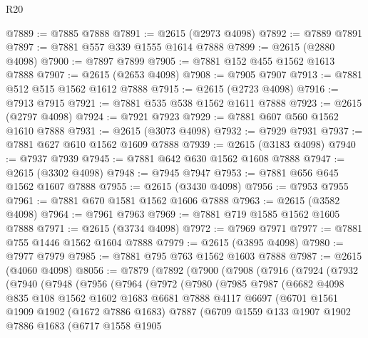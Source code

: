 \begin{lexlean}{R20}
\begin{coremodule}
@7889 := @7885 @7888
@7891 := @2615 (@2973 @4098)
@7892 := @7889 @7891
@7897 := @7881 @557 @339 @1555 @1614 @7888
@7899 := @2615 (@2880 @4098)
@7900 := @7897 @7899
@7905 := @7881 @152 @455 @1562 @1613 @7888
@7907 := @2615 (@2653 @4098)
@7908 := @7905 @7907
@7913 := @7881 @512 @515 @1562 @1612 @7888
@7915 := @2615 (@2723 @4098)
@7916 := @7913 @7915
@7921 := @7881 @535 @538 @1562 @1611 @7888
@7923 := @2615 (@2797 @4098)
@7924 := @7921 @7923
@7929 := @7881 @607 @560 @1562 @1610 @7888
@7931 := @2615 (@3073 @4098)
@7932 := @7929 @7931
@7937 := @7881 @627 @610 @1562 @1609 @7888
@7939 := @2615 (@3183 @4098)
@7940 := @7937 @7939
@7945 := @7881 @642 @630 @1562 @1608 @7888
@7947 := @2615 (@3302 @4098)
@7948 := @7945 @7947
@7953 := @7881 @656 @645 @1562 @1607 @7888
@7955 := @2615 (@3430 @4098)
@7956 := @7953 @7955
@7961 := @7881 @670 @1581 @1562 @1606 @7888
@7963 := @2615 (@3582 @4098)
@7964 := @7961 @7963
@7969 := @7881 @719 @1585 @1562 @1605 @7888
@7971 := @2615 (@3734 @4098)
@7972 := @7969 @7971
@7977 := @7881 @755 @1446 @1562 @1604 @7888
@7979 := @2615 (@3895 @4098)
@7980 := @7977 @7979
@7985 := @7881 @795 @763 @1562 @1603 @7888
@7987 := @2615 (@4060 @4098)
@8056 := @7879
    (@7892
      (@7900
        (@7908
          (@7916
            (@7924
              (@7932
                (@7940
                  (@7948
                    (@7956
                      (@7964
                        (@7972
                          (@7980
                            (@7985
                              @7987
                              (@6682
                                @4098
                                @835
                                @108
                                @1562
                                @1602
                                @1683
                                @6681
                                @7888
                                @4117
                                @6697
                                (@6701
                                  @1561
                                  @1909
                                  @1902
                                  (@1672 @7886 @1683)
                                  @7887
                                  (@6709
                                    @1559
                                    @133
                                    @1907
                                    @1902
                                    @7886
                                    @1683
                                    (@6717
                                      @1558
                                      @1905

\end{coremodule}
\end{lexlean}
